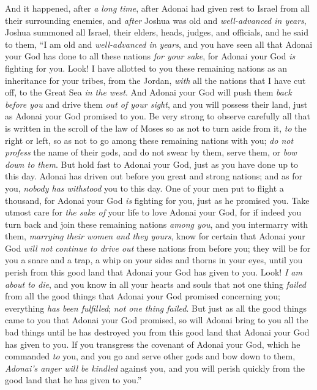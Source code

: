 \begin{biblechapter} %
 And it happened, after \textit{a long time}, after Adonai had given rest to Israel from all their surrounding enemies, and \textit{after} Joshua was old and \textit{well-advanced in years},
\verse Joshua summoned all Israel, their elders, heads, judges, and officials, and he said to them, “I am old and \textit{well-advanced in years},
\verse and you have seen all that Adonai your God has done to all these nations \textit{for your sake}, for Adonai your God \textit{is} fighting for you.
\verse Look! I have allotted to you these remaining nations as an inheritance for your tribes, from the Jordan, \textit{with} all the nations that I have cut off, to the Great Sea \textit{in the west}.
\verse And Adonai your God will push them \textit{back before you} and drive them \textit{out of your sight}, and you will possess their land, just as Adonai your God promised to you.
\verse Be very strong to observe carefully all that is written in the scroll of the law of Moses so as not to turn aside from it, \textit{to} the right or left,
\verse so as not to go among these remaining nations with you; \textit{do not profess} the name of their gods, and do not swear by them, serve them, or \textit{bow down to them}.
\verse But hold fast to Adonai your God, just as you have done up to this day.
\verse Adonai has driven out before you great and strong nations; and as for you, \textit{nobody has withstood} you to this day.
\verse One of your men put to flight a thousand, for Adonai your God \textit{is} fighting for you, just as he promised you.
\verse Take utmost care for \textit{the sake of} your life to love Adonai your God,
\verse for if indeed you turn back and join these remaining nations \textit{among you}, and you intermarry with them, \textit{marrying their women and they yours},
\verse know for certain that Adonai your God \textit{will not continue to drive out} these nations from before you; they will be for you a snare and a trap, a whip on your sides and thorns in your eyes, until you perish from this good land that Adonai your God has given to you.
\verse Look! \textit{I am about to die}, and you know in all your hearts and souls that not one thing \textit{failed} from all the good things that Adonai your God promised concerning you; everything \textit{has been fulfilled}; \textit{not one thing failed}.
\verse But just as all the good things came to you that Adonai your God promised, so will Adonai bring to you all the bad things until he has destroyed you from this good land that Adonai your God has given to you.
\verse If you transgress the covenant of Adonai your God, which he commanded \textit{to} you, and you go and serve other gods and bow down to them, \textit{Adonai’s anger will be kindled} against you, and you will perish quickly from the good land that he has given to you.”
\end{biblechapter}

